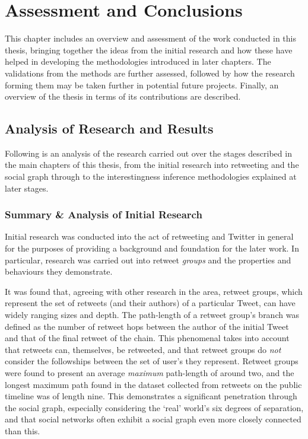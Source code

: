 \chapter{Assessment and Conclusions}
This chapter includes an overview and assessment of the work conducted in this thesis, bringing together the ideas from the initial research and how these have helped in developing the methodologies introduced in later chapters. The validations from the methods are further assessed, followed by how the research forming them may be taken further in potential future projects. Finally, an overview of the thesis in terms of its contributions are described.


\section{Analysis of Research and Results}
Following is an analysis of the research carried out over the stages described in the main chapters of this thesis, from the initial research into retweeting and the social graph through to the interestingness inference methodologies explained at later stages.

\subsection{Summary \& Analysis of Initial Research}
Initial research was conducted into the act of retweeting and Twitter in general for the purposes of providing a background and foundation for the later work. In particular, research was carried out into retweet \textit{groups} and the properties and behaviours they demonstrate.

It was found that, agreeing with other research in the area, retweet groups, which represent the set of retweets (and their authors) of a particular Tweet, can have widely ranging sizes and depth. The path-length of a retweet group's branch was defined as the number of retweet hops between the author of the initial Tweet and that of the final retweet of the chain. This phenomenal takes into account that retweets can, themselves, be retweeted, and that retweet groups do \textit{not} consider the followships between the set of user's they represent. Retweet groups were found to present an average \textit{maximum} path-length of around two, and the longest maximum path found in the dataset collected from retweets on the public timeline was of length nine. This demonstrates a significant penetration through the social graph, especially considering the `real' world's six degrees of separation, and that social networks often exhibit a social graph even more closely connected than this.

